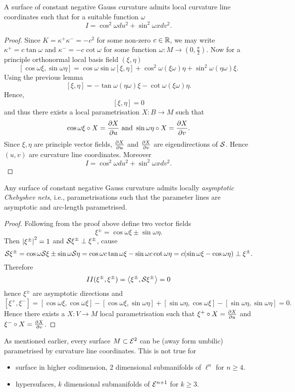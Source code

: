 \begin{corollary}
	A surface of constant negative Gauss curvature admits local curvature line coordinates such that for a suitable function $\omega$
	\[ I= \cos^2 \omega du^2 + \sin^2\omega xdv^2. \] 
\end{corollary}

\begin{proof}
	Since $K= \kappa^+\kappa^- = -c^2$ for some non-zero $c \in \mathbb R$, we may write $\kappa^+ = c \tan \omega$ and $\kappa^- = -c \cot \omega$ for some function $\omega: M \to \left( 0,\frac \pi 2 \right)$. Now for a principle orthonormal local basis field $(\xi,\eta)$
		\[ [\cos \omega \xi , \sin \omega\eta] = \cos\omega\sin\omega[\xi,\eta]	+ \cos^2 \omega(\xi\omega)\eta + \sin^2\omega(\eta\omega)\xi.  \] 
	Using the previous lemma
		\[ [\xi,\eta] = -\tan \omega(\eta\omega)\xi- \cot\omega(\xi\omega)\eta. \]
	Hence, 
		\[ [\xi,\eta]=0 \]
	and thus there exists a local parametrisation $X: B \to M$ such that
		\[ \cos\omega\xi\circ X = \frac{\partial X}{\partial u} \text{ and } \sin\omega\eta \circ X = \frac{\partial X}{\partial v}. \]
	Since $\xi,\eta$ are principle vector fields, $\frac{\partial X}{\partial u}$ and $\frac{\partial X}{\partial v}$ are eigendirections of $\mathcal S$. Hence $(u,v)$ are curvature line coordinates. Moreover
		\[ I= \cos^2 \omega du^2 + \sin^2\omega xdv^2. \] 
\end{proof}

\begin{corollary}
	Any surface of constant negative Gauss curvature admits locally \emph{asymptotic Chebyshev nets}, i.e., parametrisations such that the parameter lines are asymptotic and arc-length parametrised.
\end{corollary}

\begin{proof}
	Following from the proof above define two vector fields
		\[ \xi^\pm = \cos \omega\xi \pm \sin\omega\eta. \]
	Then $\left| \xi^\pm\right|^2=1$ and $\mathcal S \xi^\pm \perp \xi^\pm$, cause
		\[ \mathcal S \xi^\pm = \cos\omega \mathcal S \xi \pm \sin\omega \mathcal S \eta
			= \cos\omega c \tan \omega \xi - \sin\omega c \cot\omega \eta
				= c(\sin\omega\xi - \cos\omega\eta) \perp \xi^\pm. \]
	Therefore
		\[ II(\xi^\pm, \xi^\pm) = \left \langle \xi^\pm, \mathcal S\xi^\pm \right\rangle = 0 \]
	hence $\xi^\pm$ are asymptotic directions and
		\[ [\xi^+ , \xi^-] = [\cos\omega\xi, \cos\omega\xi]- [\cos\omega\xi,\sin\omega\eta] + [\sin\omega\eta,\cos\omega\xi] - [\sin\omega\eta,\sin\omega\eta]=0. \]
	Hence there exists a $X: V \to M$ local parametrisation such that $\xi^+ \circ X = \frac{\partial X}{\partial u}$ and $\xi^- \circ X = \frac{\partial X}{\partial v}$.
\end{proof}

\begin{remark}
	As mentioned earlier, every surface $M \subset \mathcal E^2$ can be (away form umbilic) parametrised by curvature line coordinates. This is not true for
	\begin{itemize}
		\item surface in higher codimension, 2 dimensional submanifolds of $\ell^n$ for $n\geq 4$.
		\item hypersufaces, $k$ dimensional submanifolds of $\mathcal E^{n+1}$ for $k\geq 3$.
	\end{itemize}
\end{remark}
